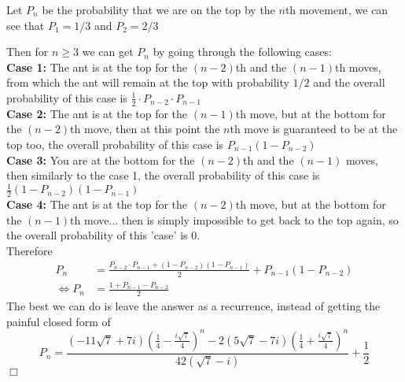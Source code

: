\begin{solution} 
    Let $P_n$ be the probability that we are on the top by the $n$th movement, we can see that $P_1 = 1/3$ and $P_2 = 2/3$
    \begin{center}
    \end{center}
    Then for $n \geq 3$ we can get $P_n$ by going through the following cases: \\[2mm]
    \textbf{Case 1:} The ant is at the top for the $(n-2)$th and the $(n-1)$th moves, from which the ant will remain at the top with probability $1/2$ and the overall probability of this case is $ \frac{1}{2} \cdot P_{n-2} \cdot P_{n-1}$ \\[2mm]
    \textbf{Case 2:} The ant is at the top for the $(n-1)$th move, but at the bottom for the $(n-2)$th move, then at this point the $n$th move is guaranteed to be at the top too, the overall probability of this case is $P_{n-1}(1 - P_{n-2})$ \\[2mm] 
    \textbf{Case 3:} You are at the bottom for the $(n-2)$th and the $(n-1)$ moves, then similarly to the case 1, the overall probability of this case is $ \frac{1}{2} (1 - P_{n-2})(1 - P_{n-1})$ \\[3mm]
    \textbf{Case 4:} The ant is at the top for the $(n-2)$th move, but at the bottom for the $(n-1)$th move... then is simply impossible to get back to the top again, so the overall probability of this 'case' is 0. \\[2mm]
    Therefore
    \begin{align*}
        P_{n} &= \frac{ P_{n-2} \cdot P_{n-1} + (1 - P_{n-2})(1 - P_{n-1}) }{2} + P_{n-1}(1 - P_{n-2}) \\
        \iff P_n &= \frac{1 + P_{n-1} - P_{n-2}}{2}
    \end{align*}
    The best we can do is leave the answer as a recurrence, instead of getting the painful closed form of 
    \[
        P_n =
        \frac{
        (-11 \sqrt{7} + 7i) \left(\frac{1}{4} - \frac{i \sqrt{7}}{4}\right)^n
        - 2 (5 \sqrt{7} - 7i) \left(\frac{1}{4} + \frac{i \sqrt{7}}{4}\right)^n
        }{
        42 (\sqrt{7} - i)
        }
        + \frac{1}{2}
    \]
    $\Box$
\end{solution}

